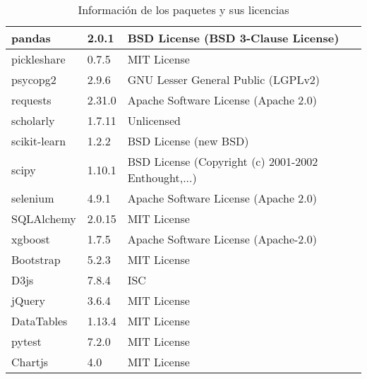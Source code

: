 \begin{table}[h]
\begin{tabular}{|l|l|l|}
pandas & 2.0.1 &  BSD License (BSD 3-Clause License) \\ \hline
pickleshare & 0.7.5 &  MIT License \\ \hline
psycopg2 & 2.9.6 &  GNU Lesser General Public (LGPLv2) \\ \hline
requests & 2.31.0 &  Apache Software License (Apache 2.0) \\ \hline
scholarly & 1.7.11 &  Unlicensed \\ \hline
scikit-learn & 1.2.2 & BSD License (new BSD) \\ \hline
scipy & 1.10.1 &  BSD License (Copyright (c) 2001-2002 Enthought,...) \\ \hline
selenium & 4.9.1 &  Apache Software License (Apache 2.0) \\ \hline
SQLAlchemy & 2.0.15 &  MIT License \\ \hline
xgboost & 1.7.5 &  Apache Software License (Apache-2.0) \\ \hline
Bootstrap & 5.2.3 &  MIT License \\ \hline
D3js & 7.8.4 &  ISC \\ \hline
jQuery & 3.6.4 &  MIT License \\ \hline
DataTables & 1.13.4 &  MIT License \\ \hline
pytest & 7.2.0 &  MIT License \\ \hline
Chartjs & 4.0 & MIT License \\ \hline
\end{tabular}
\caption{Información de los paquetes y sus licencias}
\label{tab:paquetes-licencias}
\end{table}


